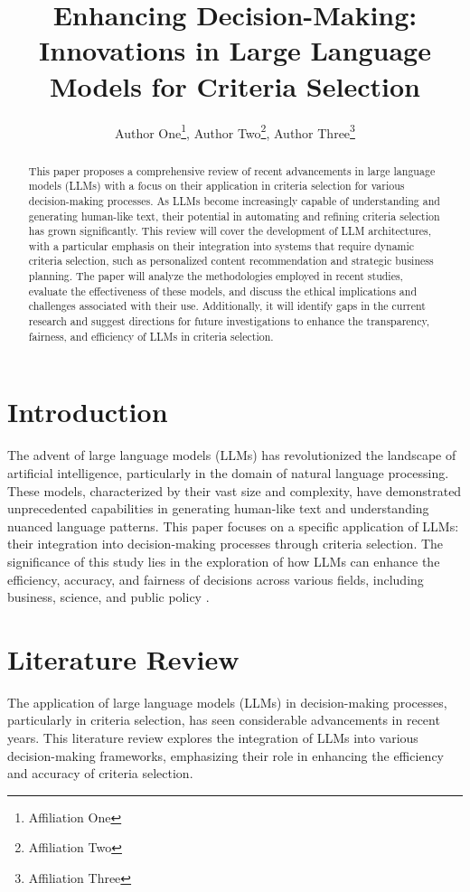 \documentclass[twocolumn]{article}
\title{Enhancing Decision-Making: Innovations in Large Language Models for Criteria Selection}
\author{Author One\thanks{Affiliation One}, Author Two\thanks{Affiliation Two}, Author Three\thanks{Affiliation Three}}
\date{}
\begin{document}
\maketitle

\begin{abstract}
This paper proposes a comprehensive review of recent advancements in large language models (LLMs) with a focus on their application in criteria selection for various decision-making processes. As LLMs become increasingly capable of understanding and generating human-like text, their potential in automating and refining criteria selection has grown significantly. This review will cover the development of LLM architectures, with a particular emphasis on their integration into systems that require dynamic criteria selection, such as personalized content recommendation and strategic business planning. The paper will analyze the methodologies employed in recent studies, evaluate the effectiveness of these models, and discuss the ethical implications and challenges associated with their use. Additionally, it will identify gaps in the current research and suggest directions for future investigations to enhance the transparency, fairness, and efficiency of LLMs in criteria selection.
\end{abstract}

\section{Introduction}
The advent of large language models (LLMs) has revolutionized the landscape of artificial intelligence, particularly in the domain of natural language processing. These models, characterized by their vast size and complexity, have demonstrated unprecedented capabilities in generating human-like text and understanding nuanced language patterns. This paper focuses on a specific application of LLMs: their integration into decision-making processes through criteria selection. The significance of this study lies in the exploration of how LLMs can enhance the efficiency, accuracy, and fairness of decisions across various fields, including business, science, and public policy \cite{Zhou2010}.

\section{Literature Review}
The application of large language models (LLMs) in decision-making processes, particularly in criteria selection, has seen considerable advancements in recent years. This literature review explores the integration of LLMs into various decision-making frameworks, emphasizing their role in enhancing the efficiency and accuracy of criteria selection.
\end{document}
